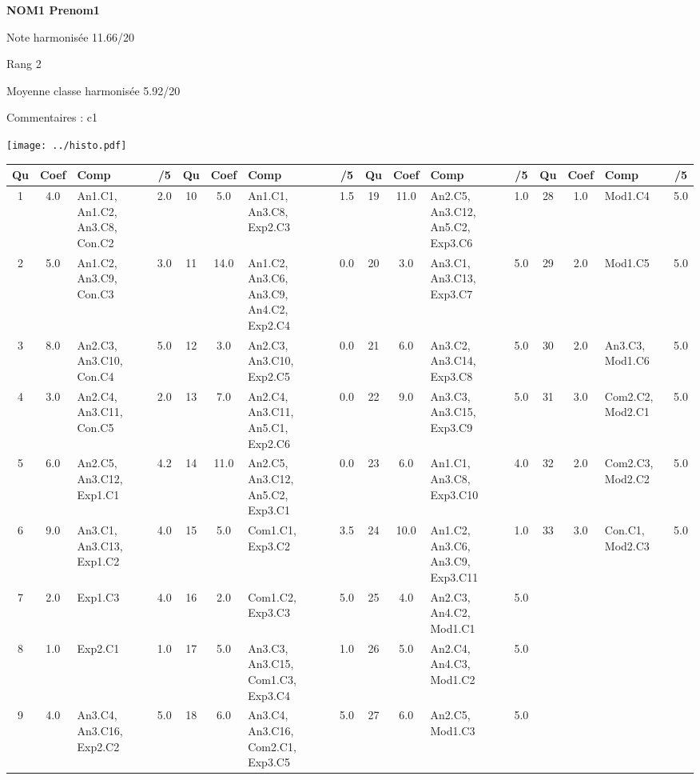 \begin{minipage}[c]{.45\linewidth} 
\Large \textbf{\textsf{NOM1 Prenom1}} 
 
 \normalsize Note harmonisée 11.66/20 
 
Rang 2
 
Moyenne classe harmonisée 5.92/20 
 
Commentaires : 
c1 
\end{minipage}\hfill 
\begin{minipage}[c]{.45\linewidth}  
\begin{center}
\texttt{[image: ../histo.pdf]} 
\end{center}
\end{minipage}
\footnotesize 
\begin{center} 
\begin{tabular}{|c|c|m{1cm}|c||c|c|m{1cm}|c||c|c|m{1cm}|c||c|c|m{1cm}|c|} 
\hline \textbf{Qu} & \textbf{Coef} & \textbf{Comp} & \textbf{/5} & \textbf{Qu} & \textbf{Coef} & \textbf{Comp} & \textbf{/5} & \textbf{Qu} & \textbf{Coef} & \textbf{Comp} & \textbf{/5} & \textbf{Qu} & \textbf{Coef} & \textbf{Comp} & \textbf{/5} \\ 
\hline 
\hline 
1 & 4.0 & An1.C1, An1.C2, An3.C8, Con.C2 & 2.0 & 10 & 5.0 & An1.C1, An3.C8, Exp2.C3 & 1.5 & 19 & 11.0 & An2.C5, An3.C12, An5.C2, Exp3.C6 & 1.0 & 28 & 1.0 & Mod1.C4 & 5.0 \\ \hline 
2 & 5.0 & An1.C2, An3.C9, Con.C3 & 3.0 & 11 & 14.0 & An1.C2, An3.C6, An3.C9, An4.C2, Exp2.C4 & 0.0 & 20 & 3.0 & An3.C1, An3.C13, Exp3.C7 & 5.0 & 29 & 2.0 & Mod1.C5 & 5.0 \\ \hline 
3 & 8.0 & An2.C3, An3.C10, Con.C4 & 5.0 & 12 & 3.0 & An2.C3, An3.C10, Exp2.C5 & 0.0 & 21 & 6.0 & An3.C2, An3.C14, Exp3.C8 & 5.0 & 30 & 2.0 & An3.C3, Mod1.C6 & 5.0 \\ \hline 
4 & 3.0 & An2.C4, An3.C11, Con.C5 & 2.0 & 13 & 7.0 & An2.C4, An3.C11, An5.C1, Exp2.C6 & 0.0 & 22 & 9.0 & An3.C3, An3.C15, Exp3.C9 & 5.0 & 31 & 3.0 & Com2.C2, Mod2.C1 & 5.0 \\ \hline 
5 & 6.0 & An2.C5, An3.C12, Exp1.C1 & 4.2 & 14 & 11.0 & An2.C5, An3.C12, An5.C2, Exp3.C1 & 0.0 & 23 & 6.0 & An1.C1, An3.C8, Exp3.C10 & 4.0 & 32 & 2.0 & Com2.C3, Mod2.C2 & 5.0 \\ \hline 
6 & 9.0 & An3.C1, An3.C13, Exp1.C2 & 4.0 & 15 & 5.0 & Com1.C1, Exp3.C2 & 3.5 & 24 & 10.0 & An1.C2, An3.C6, An3.C9, Exp3.C11 & 1.0 & 33 & 3.0 & Con.C1, Mod2.C3 & 5.0 \\ \hline 
7 & 2.0 & Exp1.C3 & 4.0 & 16 & 2.0 & Com1.C2, Exp3.C3 & 5.0 & 25 & 4.0 & An2.C3, An4.C2, Mod1.C1 & 5.0 &  &  &  &  \\ \hline 

8 & 1.0 & Exp2.C1 & 1.0 & 17 & 5.0 & An3.C3, An3.C15, Com1.C3, Exp3.C4 & 1.0 & 26 & 5.0 & An2.C4, An4.C3, Mod1.C2 & 5.0 &  &  &  &  \\ \hline 

9 & 4.0 & An3.C4, An3.C16, Exp2.C2 & 5.0 & 18 & 6.0 & An3.C4, An3.C16, Com2.C1, Exp3.C5 & 5.0 & 27 & 6.0 & An2.C5, Mod1.C3 & 5.0 &  &  &  &  \\ \hline 

\end{tabular} 
\end{center} 
\normalsize 
 
